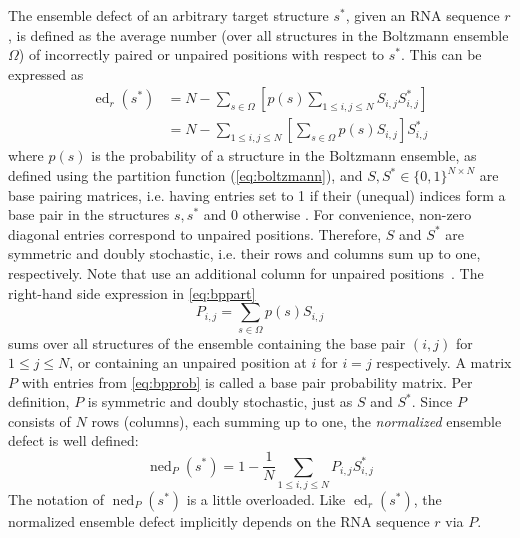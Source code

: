 \documentclass[../../master.tex]{subfiles}
\begin{document}
The ensemble defect of an arbitrary target structure $s^*$, given an RNA sequence $r$, is defined as the average number (over all structures in the Boltzmann ensemble $\Omega$) of incorrectly paired or unpaired positions with respect to $s^*$.
This can be expressed as 
\begin{equation}\label{eq:ed1}
	\begin{aligned}
		\operatorname{ed}_r(s^*) &= N - \sum_{s \in \Omega} 
		\left [ p(s) \sum_{1\le i, j \le N}
		S_{i,j} S^*_{i,j} \right ] \\
		&= N - \sum_{1\le i, j \le N} 
		\left [ \sum_{s \in \Omega}
		p(s) S_{i,j} \right ] S^*_{i,j}
	\end{aligned}
\end{equation}
where $p(s)$ is the probability of a structure in the Boltzmann ensemble, as defined using the partition function (\autoref{eq:boltzmann}), and $S, S^* \in \{0,1\}^{N\times N}$ are base pairing matrices, i.e. having entries set to 1 if their (unequal) indices form a base pair in the structures $s, s^*$ and 0 otherwise \parencite{dirks_paradigms_2004}.
For convenience, non-zero diagonal entries correspond to unpaired positions.
Therefore, $S$ and $S^*$ are symmetric and doubly stochastic, i.e. their rows and columns sum up to one, respectively.
Note that \citeauthor{dirks_paradigms_2004} use an additional column for unpaired positions~\parencite{dirks_paradigms_2004}.
The right-hand side expression in \autoref{eq:bppart}
\begin{equation}\label{eq:bpprob}
	P_{i,j} = \sum_{s \in \Omega} p(s) S_{i,j} 
\end{equation}
sums over all structures of the ensemble containing the base pair $(i, j)$ for $1\le j \le N$, or containing an unpaired position at $i$ for $i = j$ respectively.
A matrix $P$ with entries from \autoref{eq:bpprob} is called a base pair probability matrix.
Per definition, $P$ is symmetric and doubly stochastic, just as $S$ and $S^*$.
Since $P$ consists of $N$ rows (columns), each summing up to one,
the \emph{normalized} ensemble defect is well defined:
\begin{equation}\label{eq:ned}
	\operatorname{ned}_P(s^*) = 1 - \frac{1}{N} \sum_{1\le i, j \le N} P_{i,j} S_{i,j}^*
\end{equation}
The notation of $\operatorname{ned}_P(s^*)$ is a little overloaded. 
Like $\operatorname{ed}_r(s^*)$, the normalized ensemble defect implicitly depends on the RNA sequence $r$ via $P$.
\end{document}
